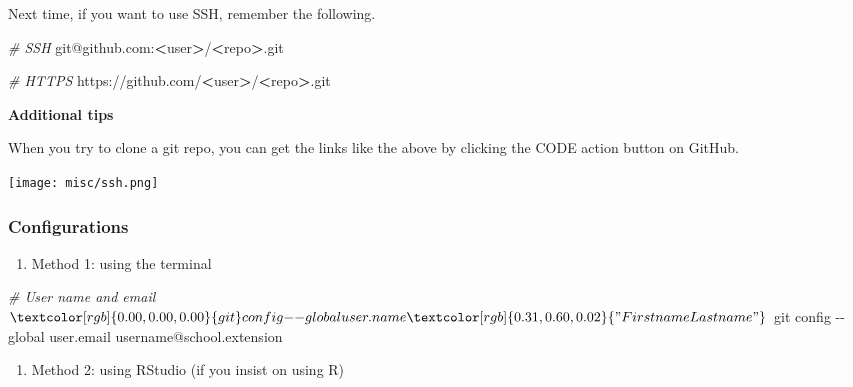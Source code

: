 \documentclass[
]{book}
\newenvironment{Shaded}{\begin{snugshade}}{\end{snugshade}}
\newcommand{\CommentTok}[1]{\textcolor[rgb]{0.56,0.35,0.01}{\textit{#1}}}
\newcommand{\ExtensionTok}[1]{#1}
\newcommand{\FunctionTok}[1]{\textcolor[rgb]{0.00,0.00,0.00}{#1}}
\newcommand{\NormalTok}[1]{#1}
\newcommand{\OperatorTok}[1]{\textcolor[rgb]{0.81,0.36,0.00}{\textbf{#1}}}
\newcommand{\StringTok}[1]{\textcolor[rgb]{0.31,0.60,0.02}{#1}}
\providecommand{\tightlist}{%
  \setlength{\itemsep}{0pt}\setlength{\parskip}{0pt}}
\begin{document}
Next time, if you want to use SSH, remember the following.

\begin{Shaded}
\begin{Highlighting}[]
\CommentTok{\# SSH}
\ExtensionTok{git@github.com}\NormalTok{:}\OperatorTok{\textless{}}\NormalTok{user}\OperatorTok{\textgreater{}}\NormalTok{/}\OperatorTok{\textless{}}\NormalTok{repo}\OperatorTok{\textgreater{}}\NormalTok{.git}

\CommentTok{\# HTTPS}
\ExtensionTok{https}\NormalTok{://github.com/}\OperatorTok{\textless{}}\NormalTok{user}\OperatorTok{\textgreater{}}\NormalTok{/}\OperatorTok{\textless{}}\NormalTok{repo}\OperatorTok{\textgreater{}}\NormalTok{.git}
\end{Highlighting}
\end{Shaded}

\textbf{Additional tips}

When you try to clone a git repo, you can get the links like the above by clicking the CODE action button on GitHub.

\texttt{[image: misc/ssh.png]}

\hypertarget{configurations}{%
\subsubsection{Configurations}\label{configurations}}

\begin{enumerate}
\def\labelenumi{\arabic{enumi}.}
\tightlist
\item
  Method 1: using the terminal
\end{enumerate}

\begin{Shaded}
\begin{Highlighting}[]

\CommentTok{\# User name and email }
\NormalTok{$ }\FunctionTok{git}\NormalTok{ config {-}{-}global user.name }\StringTok{"Firstname Lastname"}
\NormalTok{$ }\FunctionTok{git}\NormalTok{ config {-}{-}global user.email username@school.extension}
\end{Highlighting}
\end{Shaded}

\begin{enumerate}
\def\labelenumi{\arabic{enumi}.}
\setcounter{enumi}{1}
\tightlist
\item
  Method 2: using RStudio (if you insist on using R)
\end{enumerate}
\end{document}
